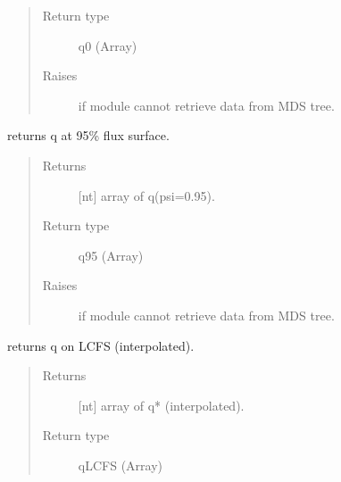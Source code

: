 \documentclass[letterpaper,10pt,english]{sphinxmanual}
\begin{document}
\begin{fulllineitems}
\begin{fulllineitems}
\begin{quote}
\begin{description}
\item[{Return type}] \leavevmode
q0 (Array)

\item[{Raises}] \leavevmode
{} \textendash{} if module cannot retrieve data from MDS tree.

\end{description}\end{quote}

\end{fulllineitems}


\begin{fulllineitems}
\label{\detokenize{eqtools:eqtools.EFIT.EFITTree.getQ95}}
returns q at 95\% flux surface.
\begin{quote}\begin{description}
\item[{Returns}] \leavevmode
{[}nt{]} array of q(psi=0.95).

\item[{Return type}] \leavevmode
q95 (Array)

\item[{Raises}] \leavevmode
{} \textendash{} if module cannot retrieve data from MDS tree.

\end{description}\end{quote}

\end{fulllineitems}


\begin{fulllineitems}
\label{\detokenize{eqtools:eqtools.EFIT.EFITTree.getQLCFS}}
returns q on LCFS (interpolated).
\begin{quote}\begin{description}
\item[{Returns}] \leavevmode
{[}nt{]} array of q* (interpolated).

\item[{Return type}] \leavevmode
qLCFS (Array)


\end{description}
\end{quote}
\end{fulllineitems}
\end{fulllineitems}
\end{document}
